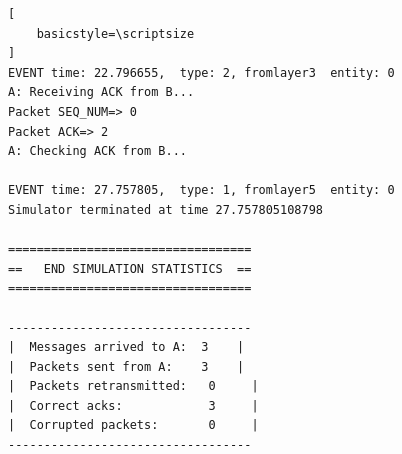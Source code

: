 \documentclass[a4paperr]{article}
\begin{document}
\begin{lstlisting}[
    basicstyle=\scriptsize 
]
EVENT time: 22.796655,  type: 2, fromlayer3  entity: 0
A: Receiving ACK from B...
Packet SEQ_NUM=> 0
Packet ACK=> 2
A: Checking ACK from B...

EVENT time: 27.757805,  type: 1, fromlayer5  entity: 0
Simulator terminated at time 27.757805108798
 
==================================
==   END SIMULATION STATISTICS  ==
==================================
 
----------------------------------
|  Messages arrived to A:  3    |
|  Packets sent from A:    3    |
|  Packets retransmitted:   0     |
|  Correct acks:            3     |
|  Corrupted packets:       0     |
----------------------------------

\end{lstlisting}

\newpage
\end{document}
